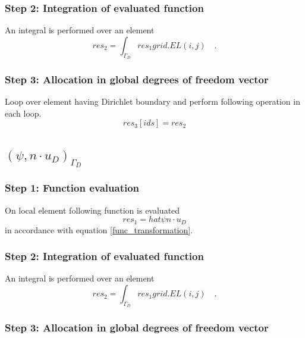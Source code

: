 \documentclass[a4paper]{book}
\begin{document}
\subsubsection{Step 2: Integration of evaluated function}

An integral is performed over an element 
\begin{equation}
res_2=\int_{\Gamma_D} res_1 grid.EL(i,j) \quad \textrm{.}
\end{equation}

\subsubsection{Step 3: Allocation in global degrees of freedom vector}

Loop over element having Dirichlet boundary and perform following operation in each loop. 
\begin{equation}
res_3[ids]=res_2
\end{equation}

\subsection{$(\psi, n \cdot u_D)_{\Gamma_D} $}

\subsubsection{Step 1: Function evaluation}

On local element following function is evaluated 
\begin{equation}
res_1 = hat{\psi} n\cdot u_D
\end{equation} 
in accordance with equation \ref{func_transformation}.\\

\subsubsection{Step 2: Integration of evaluated function}

An integral is performed over an element 
\begin{equation}
res_2 = \int_{\Gamma_D} res_1 grid.EL(i,j) \quad \textrm{.}
\end{equation}

\subsubsection{Step 3: Allocation in global degrees of freedom vector}
\end{document}
